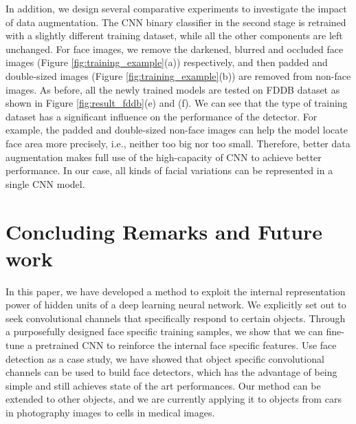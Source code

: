 \documentclass[10pt,twocolumn,letterpaper]{article}
\begin{document}
In addition, we design several comparative experiments to investigate the impact of data augmentation. The CNN binary classifier in the second stage is retrained with a slightly different training dataset, while all the other components are left unchanged. For face images, we remove the darkened, blurred and occluded face images (Figure \ref{fig:training_example}(a)) respectively, and then padded and double-sized images (Figure \ref{fig:training_example}(b)) are removed from non-face images. As before, all the newly trained models are tested on FDDB dataset as shown in Figure \ref{fig:result_fddb}(e) and (f). We can see that the type of training dataset has a significant influence on the performance of the detector. For example, the padded and double-sized non-face images can help the model locate face area more precisely, i.e., neither too big nor too small. Therefore, better data augmentation makes full use of the high-capacity of CNN to achieve better performance. In our case, all kinds of facial variations can be represented in a single CNN model.

\section{Concluding Remarks and Future work}
In this paper, we have developed a method to exploit the internal representation power of hidden units of a deep learning neural network. We explicitly set out to seek convolutional channels that specifically respond to certain objects. Through a purposefully designed face specific training samples, we show that we can fine-tune a pretrained CNN to reinforce the internal face specific features. Use face detection as a case study, we have showed that object specific convolutional channels can be used to build face detectors, which has the advantage of being simple and still achieves state of the art performances. Our method can be extended to other objects, and we are currently applying it to objects from cars in photography images to cells in medical images.


{\small


}
\end{document}
